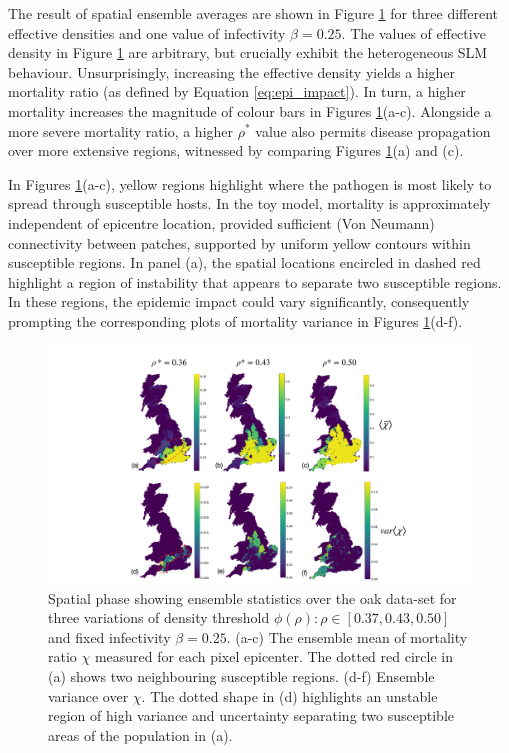 The result of spatial ensemble averages are shown in Figure \ref{fig:oak-spatial-ensemble}
for three different effective densities and one value of infectivity $\beta=0.25$. 
The values of effective density in Figure \ref{fig:oak-spatial-ensemble} are arbitrary,
but crucially exhibit the heterogeneous SLM behaviour. Unsurprisingly, increasing the effective density yields a 
higher mortality ratio (as defined by Equation \ref{eq:epi_impact}).
In turn, a higher mortality increases the magnitude of colour bars in Figures \ref{fig:oak-spatial-ensemble}(a-c). Alongside a more severe mortality ratio, a higher $\rho^*$
value also permits disease propagation over more extensive regions, witnessed by comparing Figures \ref{fig:oak-spatial-ensemble}(a) and (c).

In Figures \ref{fig:oak-spatial-ensemble}(a-c), yellow regions highlight where the pathogen is most 
likely to spread through susceptible hosts. In the toy model, mortality is approximately independent of epicentre location, 
provided sufficient (Von Neumann) connectivity between patches, supported by uniform yellow contours within susceptible regions.
In panel (a), the spatial locations encircled in dashed red highlight a region of instability that appears to separate two susceptible regions.
In these regions, the epidemic impact could vary significantly, 
consequently prompting the corresponding plots of mortality variance in Figures \ref{fig:oak-spatial-ensemble}(d-f).

\begin{figure}
    \centering
    \includegraphics[scale=0.4]{chapter4/figures/figure5.pdf}
    \caption{Spatial phase showing ensemble statistics over the oak data-set for three variations of density threshold $\phi(\rho): \rho \in [0.37, 0.43, 0.50]$ and fixed infectivity $\beta=0.25$. (a-c) The ensemble mean of mortality ratio $\chi$ measured for each pixel epicenter. The dotted red circle in (a) shows two neighbouring susceptible regions. (d-f) Ensemble variance over $\chi$. The dotted shape in (d) highlights an unstable region of high variance and uncertainty separating two susceptible areas of the population in (a).}
    \label{fig:oak-spatial-ensemble}
\end{figure}

